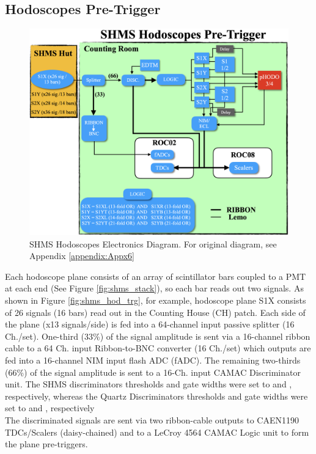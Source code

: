 \documentclass[11pt]{article}
\begin{document}
\subsection{Hodoscopes Pre-Trigger}
\begin{figure}[h!]
  \centering
  \includegraphics[scale=0.35]{images/pHODO_diagram.png}
  \caption{SHMS Hodoscopes Electronics Diagram. For original diagram, see Appendix \ref{appendix:Appx6}}
  \label{fig:pHODO_diagram}
\end{figure}
Each hodoscope plane consists of an array of scintillator bars coupled to a PMT at each end (See Figure \ref{fig:shms_stack}), so each bar reads out two signals. As shown in Figure \ref{fig:shms_hod_trg},
for example, hodoscope plane S1X consists of 26 signals (16 bars) read out in the Counting House (CH) patch. Each side of the plane (x13 signals/side) is fed into a 64-channel input passive splitter (16 Ch./set).
One-third (33\%) of the signal amplitude is sent via a 16-channel ribbon cable to a 64 Ch. input Ribbon-to-BNC converter (16 Ch./set) which outputs are fed into a 16-channel NIM input flash ADC (fADC).
The remaining two-thirds (66\%) of the signal amplitude is sent to a 16-Ch. input CAMAC Discriminator unit. The SHMS discriminators thresholds and gate widths were set to \shodthrs and \shodgate, respectively,
whereas the Quartz Discriminators thresholds and gate widths were set to \quartzthrs and \shodgate, respectively\\
\indent The discriminated signals are sent via two ribbon-cable outputs to CAEN1190 TDCs/Scalers (daisy-chained) and to a LeCroy 4564 CAMAC Logic unit to form the plane pre-triggers.
\end{document}
